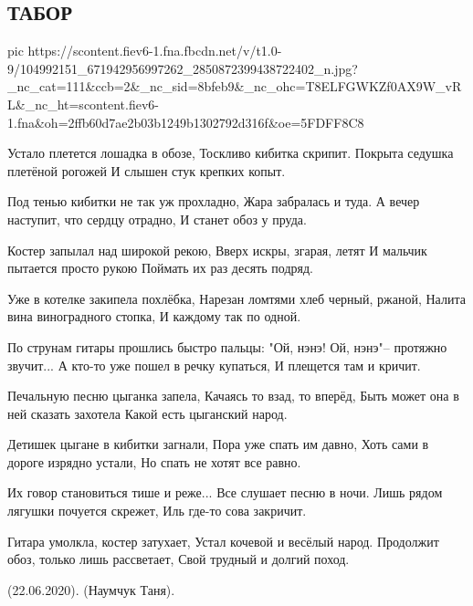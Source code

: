  
 
 

\subsection{ТАБОР}
\label{sec:22_06_2020.fb.naumchuk_tanya.1.tabor}

\ifcmt
pic https://scontent.fiev6-1.fna.fbcdn.net/v/t1.0-9/104992151_671942956997262_2850872399438722402_n.jpg?_nc_cat=111&ccb=2&_nc_sid=8bfeb9&_nc_ohc=T8ELFGWKZf0AX9W_vRL&_nc_ht=scontent.fiev6-1.fna&oh=2ffb60d7ae2b03b1249b1302792d316f&oe=5FDFF8C8
\fi

\begin{multicols}{2}
	\obeycr
Устало плетется лошадка в обозе,
Тоскливо кибитка скрипит.
Покрыта седушка плетёной рогожей
И слышен стук крепких копыт.

Под тенью кибитки не так уж прохладно,
Жара забралась и туда.
А вечер наступит, что сердцу отрадно,
И станет обоз у пруда.

Костер запылал над широкой рекою,
Вверх искры, згарая, летят
И мальчик пытается просто рукою
Поймать их раз десять подряд.

Уже в котелке закипела похлёбка,
Нарезан ломтями хлеб черный, ржаной,
Налита вина виноградного стопка,
И каждому так по одной.

По струнам гитары прошлись быстро пальцы:
"Ой, нэнэ! Ой, нэнэ"-- протяжно звучит...
А кто-то уже пошел в речку купаться,
И плещется там и кричит.

Печальную песню цыганка запела,
Качаясь то взад, то вперёд,
Быть может она в ней сказать захотела
Какой есть цыганский народ.

Детишек цыгане в кибитки загнали,
Пора уже спать им давно,
Хоть сами в дороге изрядно устали,
Но спать не хотят все равно.

Их говор становиться тише и реже...
Все слушает песню в ночи.
Лишь рядом лягушки почуется скрежет,
Иль где-то сова закричит.

Гитара умолкла, костер затухает,
Устал кочевой и весёлый народ.
Продолжит обоз, только лишь рассветает,
Свой трудный и долгий поход.

(22.06.2020). (Наумчук Таня).
	\restorecr
\end{multicols}
